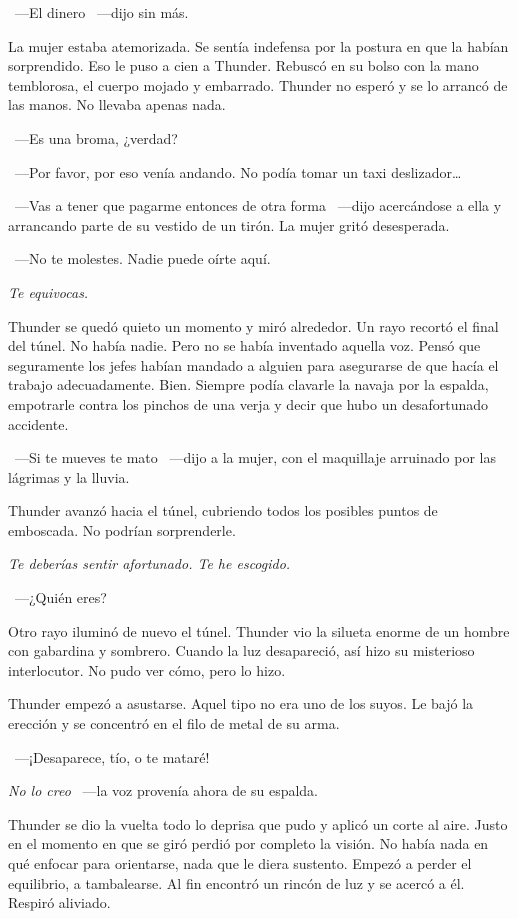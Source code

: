 ~---El dinero ~---dijo sin más.

La mujer estaba atemorizada. Se sentía indefensa por la postura en que la habían sorprendido. Eso le puso a cien a Thunder. Rebuscó en su bolso con la mano temblorosa, el cuerpo mojado y embarrado. Thunder no esperó y se lo arrancó de las manos. No llevaba apenas nada.

~---Es una broma, ¿verdad?

~---Por favor, por eso venía andando. No podía tomar un taxi deslizador\dots

~---Vas a tener que pagarme entonces de otra forma ~---dijo acercándose a ella y arrancando parte de su vestido de un tirón. La mujer gritó desesperada.

~---No te molestes. Nadie puede oírte aquí.

\emph{Te equivocas.}

Thunder se quedó quieto un momento y miró alrededor. Un rayo recortó el final del túnel. No había nadie. Pero no se había inventado aquella voz. Pensó que seguramente los jefes habían mandado a alguien para asegurarse de que hacía el trabajo adecuadamente. Bien. Siempre podía clavarle la navaja por la espalda, empotrarle contra los pinchos de una verja y decir que hubo un desafortunado accidente.

~---Si te mueves te mato ~---dijo a la mujer, con el maquillaje arruinado por las lágrimas y la lluvia.

Thunder avanzó hacia el túnel, cubriendo todos los posibles puntos de emboscada. No podrían sorprenderle.

\emph{Te deberías sentir afortunado. Te he escogido.}

~---¿Quién eres?

Otro rayo iluminó de nuevo el túnel. Thunder vio la silueta enorme de un hombre con gabardina y sombrero. Cuando la luz desapareció, así hizo su misterioso interlocutor. No pudo ver cómo, pero lo hizo.

Thunder empezó a asustarse. Aquel tipo no era uno de los suyos. Le bajó la erección y se concentró en el filo de metal de su arma.

~---¡Desaparece, tío, o te mataré!

\emph{No lo creo} ~---la voz provenía ahora de su espalda.

Thunder se dio la vuelta todo lo deprisa que pudo y aplicó un corte al aire. Justo en el momento en que se giró perdió por completo la visión. No había nada en qué enfocar para orientarse, nada que le diera sustento. Empezó a perder el equilibrio, a tambalearse. Al fin encontró un rincón de luz y se acercó a él. Respiró aliviado.


